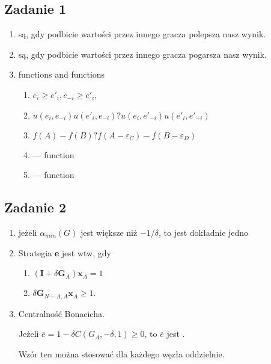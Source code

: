 \subsection{Zadanie 1}
\begin{enumerate}
    \item
       są, gdy podbicie wartości przez innego gracza polepsza nasz wynik.
    \item
       są, gdy podbicie wartości przez innego gracza pogarsza nasz wynik.
    \item
         functions and  functions
        \begin{enumerate}
            \item
                $e_i \geq e'_i, e_{-i} \geq e'_i$,
            \item
                $ u(e_i, e_{-i}) u(e'_i, e_{-i}) ?  u(e_i, e'_{-i}) u(e'_i, e'_{-i}) $
            \item
                $ f(A) - f(B) ?  f(A - \varepsilon_C) - f(B - \varepsilon_D) $
            \item
                --- function
            \item
                --- function
        \end{enumerate}
\end{enumerate}

\subsection{Zadanie 2}
\begin{enumerate}
  \item
    jeżeli $\alpha_{min}(G)$ jest większe niż $-1/\delta$, to jest dokładnie jedno
  \item Strategia \textbf{e} jest  wtw, gdy
    \begin{enumerate}
      \item $ (\textbf{I} + \delta \textbf{G}_{A})\textbf{x}_{A} = 1$
      \item $ \delta\textbf{G}_{N-A,A}\textbf{x}_A \geq 1.$
    \end{enumerate}
  \item
    Centralność Bonacicha.

    Jeżeli $\overline{e} = \overline{1} - \delta C(G_A, -\delta, 1) \geq \overline{0}$,
    to $\overline{e}$  jest .

    Wzór ten można stosować dla każdego węzła oddzielnie.
\end{enumerate}

